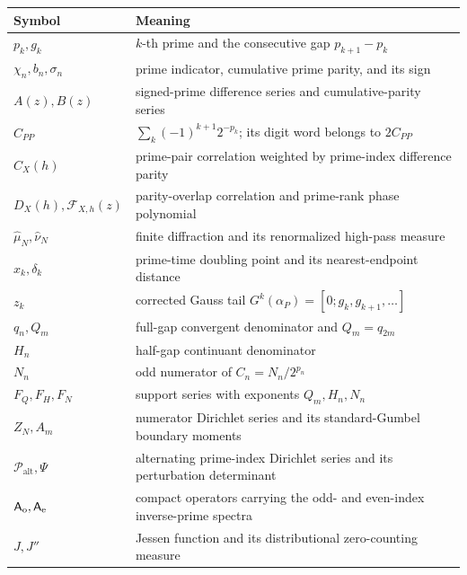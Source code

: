 \documentclass[11pt]{article}
\theoremstyle{definition}
\theoremstyle{remark}
\newcommand{\Palt}{\mathcal P_{\mathrm{alt}}}
\begin{document}
\begin{center}
\small
\begin{tabularx}{\textwidth}{@{}l>{\raggedright\arraybackslash}X@{}}
\toprule
Symbol & Meaning\\
\midrule
$p_k,g_k$ & $k$-th prime and the consecutive gap $p_{k+1}-p_k$\\
$\chi_n,b_n,\sigma_n$ & prime indicator, cumulative prime parity, and its sign\\
$A(z),B(z)$ & signed-prime difference series and cumulative-parity series\\
$C_{PP}$ & $\sum_k(-1)^{k+1}2^{-p_k}$; its digit word belongs to $2C_{PP}$\\
$C_X(h)$ & prime-pair correlation weighted by prime-index difference parity\\
$D_X(h),\mathcal F_{X,h}(z)$ & parity-overlap correlation and prime-rank phase polynomial\\
$\widehat\mu_N,\widehat\nu_N$ & finite diffraction and its renormalized high-pass measure\\
$x_k,\delta_k$ & prime-time doubling point and its nearest-endpoint distance\\
$z_k$ & corrected Gauss tail $G^k(\alpha_P)=[0;g_k,g_{k+1},\ldots]$\\
$q_n,Q_m$ & full-gap convergent denominator and $Q_m=q_{2m}$\\
$H_n$ & half-gap continuant denominator\\
$N_n$ & odd numerator of $C_n=N_n/2^{p_n}$\\
$F_Q,F_H,F_N$ & support series with exponents $Q_m,H_n,N_n$\\
$Z_N,A_m$ & numerator Dirichlet series and its standard-Gumbel boundary moments\\
$\Palt,\Psi$ & alternating prime-index Dirichlet series and its perturbation determinant\\
$\mathsf A_{\rm o},\mathsf A_{\rm e}$ & compact operators carrying the odd- and even-index inverse-prime spectra\\
$J,J''$ & Jessen function and its distributional zero-counting measure\\
\bottomrule
\end{tabularx}
\end{center}
\end{document}

